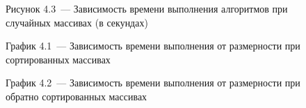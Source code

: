 \documentclass[12pt, a4paper]{report}
\begin{document}
\begin{figure}[H]
\caption*{Рисунок 4.3~--- Зависимость времени выполнения алгоритмов при случайных массивах (в секундах)}
\end{figure}

\begin{figure}[H]
\caption*{График 4.1~--- Зависимость времени выполнения от размерности при сортированных массивах}
\end{figure}

\begin{figure}[H]
\caption*{График 4.2~--- Зависимость времени выполнения от размерности при обратно сортированных массивах}
\end{figure}
\end{document}
